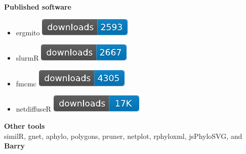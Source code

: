 \documentclass[aspectratio=169, 9pt]{beamer}
\begin{document}
\begin{frame}[t]
{\textbf{Published software}
\begin{itemize}
\item ergmito \includegraphics[width=.3\linewidth]{cran-downloads-ergmito.pdf}
\item slurmR \includegraphics[width=.3\linewidth]{cran-downloads-slurmr.pdf}
\item fmcmc \includegraphics[width=.3\linewidth]{cran-downloads-fmcmc.pdf}
\item netdiffuseR \includegraphics[width=.3\linewidth]{cran-downloads-netdiffuser.pdf}
\end{itemize}\pause

\textbf{Other tools}\\
similR, gnet, aphylo, polygons, pruner, netplot, rphyloxml, jsPhyloSVG,\pause{} and {\large\color{usccardinal}\textbf{Barry}}

}

\end{frame}
\end{document}
